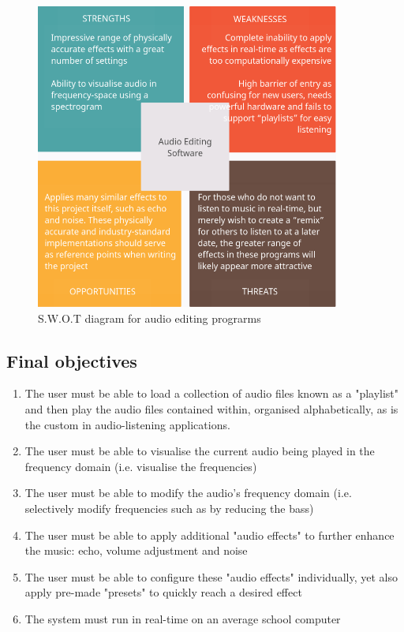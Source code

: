 \begin{figure}[H]
	\caption{S.W.O.T diagram for audio editing prograrms}
	\begin{center}
		\includegraphics[width=10cm]{./SWOT audacity.png}
	\end{center}
\end{figure}

\pagebreak
\subsection{Final objectives}
\begin{enumerate}
	\item  The user must be able to load a collection of audio files known as a "playlist" and then play the audio files contained within, organised alphabetically, as is the custom in audio-listening applications.
	\item  The user must be able to visualise the current audio being played in the frequency domain (i.e. visualise the frequencies)
	\item The user must be able to modify the audio's frequency domain (i.e. selectively modify frequencies such as by reducing the bass)
	\item The user must be able to apply additional "audio effects" to further enhance the music: echo, volume adjustment and noise
	\item The user must be able to configure these "audio effects" individually, yet also apply pre-made "presets" to quickly reach a desired effect
	\item  The system must run in real-time on an average school computer
\end{enumerate}